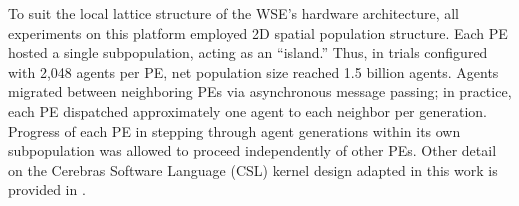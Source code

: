 
To suit the local lattice structure of the WSE's hardware architecture, all experiments on this platform employed 2D spatial population structure.
Each PE hosted a single subpopulation, acting as an ``island.''
Thus, in trials configured with 2,048 agents per PE, net population size reached 1.5 billion agents.
Agents migrated between neighboring PEs via asynchronous message passing;
in practice, each PE dispatched approximately one agent to each neighbor per generation.
Progress of each PE in stepping through agent generations within its own subpopulation was allowed to proceed independently of other PEs.
Other detail on the Cerebras Software Language (CSL) kernel design adapted in this work is provided in \citet{moreno2024trackable}.




